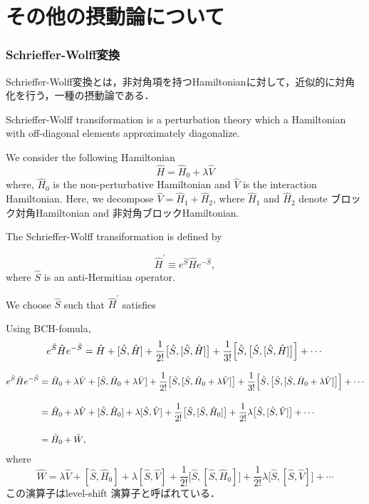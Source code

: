 
\part{その他の摂動論について}
\section{Schrieffer-Wolff変換}
Schrieffer-Wolff変換とは，非対角項を持つHamiltonianに対して，近似的に対角化を行う，一種の摂動論である．

Schrieffer-Wolff transiformation is a perturbation theory which a Hamiltonian with off-diagonal elements approximately diagonalize.

We consider the following Hamiltonian
\begin{equation}
    \hat{H} = \hat{H}_0 + \lambda\hat{V}
\end{equation}
where, $\hat{H}_0$ is the non-perturbative Hamiltonian and $\hat{V}$ is the interaction Hamiltonian. Here, we decompose $\hat{V}=\hat{H}_1 + \hat{H}_2$, where $\hat{H}_1$ and $\hat{H}_2$ denote ブロック対角Hamiltonian and  非対角ブロックHamiltonian.


The Schrieffer-Wolff transiformation is defined by 

\begin{equation}
    \hat{H}^{\prime}\equiv e^{\hat{S}}\hat{H} e^{-\hat{S}},
\end{equation}
where $\hat{S}$ is an anti-Hermitian operator. 

We choose $\hat{S}$ such that $\hat{H}^{\prime}$ satisfies

Using BCH-fomula, 
\begin{equation}
    e^{\hat{S}}\hat{H}e^{-\hat{S}}
    =\hat{H}+[\hat{S}, \hat{H}]
    +\frac{1}{2!}\bigl[
    \hat{S}, [\hat{S}, \hat{H}]
    \bigr]
    +\frac{1}{3!}
    \Bigl[\hat{S},
    \bigl[
    \hat{S}, [\hat{S}, \hat{H}]
    \bigr]
    \Bigr]
    +\cdots
\end{equation}

\begin{align}
    e^{\hat{S}}\hat{H}e^{-\hat{S}}
    &=\hat{H}_0 + \lambda\hat{V}+[\hat{S}, \hat{H}_0 + \lambda\hat{V}]
    +\frac{1}{2!}\bigl[
    \hat{S}, [\hat{S}, \hat{H}_0 + \lambda\hat{V}]
    \bigr]
    +\frac{1}{3!}
    \Bigl[\hat{S},
    \bigl[
    \hat{S}, [\hat{S}, \hat{H}_0 + \lambda\hat{V}]
    \bigr]
    \Bigr]
    +\cdots\nn[10pt]
    &=\hat{H}_0 + \lambda\hat{V}+[\hat{S}, \hat{H}_0] +
    \lambda[\hat{S}, \hat{V}]
    +\frac{1}{2!}\bigl[
    \hat{S}, [\hat{S}, \hat{H}_0]
    \bigr]
    +\frac{1}{2!}\lambda\bigl[
    \hat{S}, [\hat{S}, \hat{V}]
    \bigr]
    +\cdots \\[10pt]
    &=\hat{H}_0 + \hat{W},
\end{align}
where
\begin{equation}
    \hat{W} = \lambda\hat{V}+[\hat{S}, \hat{H}_0] +
    \lambda[\hat{S}, \hat{V}]
    +\frac{1}{2!}\bigl[
    \hat{S}, [\hat{S}, \hat{H}_0]
    \bigr]
    +\frac{1}{2!}\lambda\bigl[
    \hat{S}, [\hat{S}, \hat{V}]
    \bigr]
    +\cdots
\end{equation}
この演算子はlevel-shift 演算子と呼ばれている．


